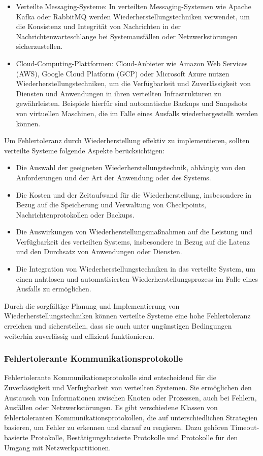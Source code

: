 \documentclass[../vs-script-first-v01.tex]{subfiles}
\begin{document}
\begin{itemize}
\item Verteilte Messaging-Systeme: In verteilten Messaging-Systemen wie Apache Kafka oder RabbitMQ werden Wiederherstellungstechniken verwendet, um die Konsistenz und Integrität von Nachrichten in der Nachrichtenwarteschlange bei Systemausfällen oder Netzwerkstörungen sicherzustellen.
\item Cloud-Computing-Plattformen: Cloud-Anbieter wie Amazon Web Services (AWS), Google Cloud Platform (GCP) oder Microsoft Azure nutzen Wiederherstellungstechniken, um die Verfügbarkeit und Zuverlässigkeit von Diensten und Anwendungen in ihren verteilten Infrastrukturen zu gewährleisten. Beispiele hierfür sind automatische Backups und Snapshots von virtuellen Maschinen, die im Falle eines Ausfalls wiederhergestellt werden können.
\end{itemize}
Um Fehlertoleranz durch Wiederherstellung effektiv zu implementieren, sollten verteilte Systeme folgende Aspekte berücksichtigen:
\begin{itemize}
\item Die Auswahl der geeigneten Wiederherstellungstechnik, abhängig von den Anforderungen und der Art der Anwendung oder des Systems.
\item Die Kosten und der Zeitaufwand für die Wiederherstellung, insbesondere in Bezug auf die Speicherung und Verwaltung von Checkpoints, Nachrichtenprotokollen oder Backups.
\item Die Auswirkungen von Wiederherstellungsmaßnahmen auf die Leistung und Verfügbarkeit des verteilten Systems, insbesondere in Bezug auf die Latenz und den Durchsatz von Anwendungen oder Diensten.
\item Die Integration von Wiederherstellungstechniken in das verteilte System, um einen nahtlosen und automatisierten Wiederherstellungsprozess im Falle eines Ausfalls zu ermöglichen.
\end{itemize}
Durch die sorgfältige Planung und Implementierung von Wiederherstellungstechniken können verteilte Systeme eine hohe Fehlertoleranz erreichen und sicherstellen, dass sie auch unter ungünstigen Bedingungen weiterhin zuverlässig und effizient funktionieren.

\subsubsection{Fehlertolerante Kommunikationsprotokolle}

Fehlertolerante Kommunikationsprotokolle sind entscheidend für die Zuverlässigkeit und Verfügbarkeit von verteilten Systemen. Sie ermöglichen den Austausch von Informationen zwischen Knoten oder Prozessen, auch bei Fehlern, Ausfällen oder Netzwerkstörungen. Es gibt verschiedene Klassen von fehlertoleranten Kommunikationsprotokollen, die auf unterschiedlichen Strategien basieren, um Fehler zu erkennen und darauf zu reagieren. Dazu gehören Timeout-basierte Protokolle, Bestätigungsbasierte Protokolle und Protokolle für den Umgang mit Netzwerkpartitionen.
\end{document}
